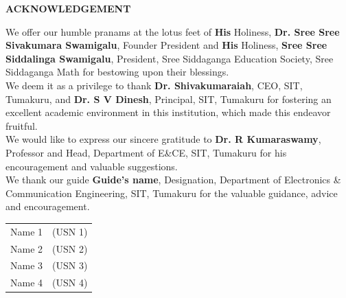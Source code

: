 \begin{titlepage}
\begin{center}
{\Large \textbf{ACKNOWLEDGEMENT}}
\end{center}

We offer our humble pranams at the lotus feet of \textbf{His} Holiness, \textbf{Dr. Sree Sree Sivakumara Swamigalu}, Founder President and \textbf{His} Holiness, \textbf{Sree Sree Siddalinga Swamigalu}, President, Sree Siddaganga Education Society, Sree Siddaganga Math for bestowing upon their blessings.\\

We deem it as a privilege to thank \textbf{Dr. Shivakumaraiah}, CEO, SIT, Tumakuru,  and \textbf{Dr. S V Dinesh}, Principal, SIT, Tumakuru for fostering an excellent academic environment in this institution, which made this endeavor fruitful.\\

We would like to express our sincere gratitude to \textbf{Dr. R Kumaraswamy}, Professor and Head, Department of E\&CE, SIT, Tumakuru for his encouragement and valuable suggestions.\\

We thank our guide \textbf{Guide's name}, Designation, Department of Electronics \& Communication Engineering, SIT, Tumakuru for the valuable guidance, advice and encouragement.\\


\begin{flushright}
\begin{tabular}{ll}
Name 1 & (USN 1)  \\
Name 2 & (USN 2)  \\
Name 3 & (USN 3)  \\
Name 4 & (USN 4)  \\
\end{tabular}\\[1.5cm]
\end{flushright}
\end{titlepage}